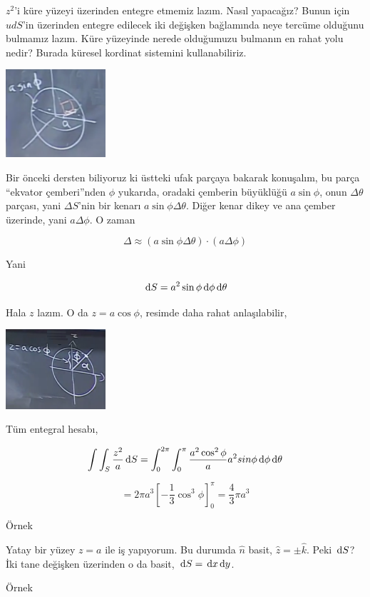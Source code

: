 \documentclass[12pt,fleqn]{article}\usepackage{../../common}
\begin{document}
$z^2$'i küre yüzeyi üzerinden entegre etmemiz lazım. Nasıl yapacağız?  Bunun
için $ud S$'in üzerinden entegre edilecek iki değişken bağlamında neye tercüme
olduğunu bulmamız lazım. Küre yüzeyinde nerede olduğumuzu bulmanın en rahat yolu
nedir? Burada küresel kordinat sistemini kullanabiliriz.

\includegraphics[width=10em]{calc_multi_27_05.png}

Bir önceki dersten biliyoruz ki üstteki ufak parçaya bakarak konuşalım, bu parça
``ekvator çemberi''nden $\phi$ yukarıda, oradaki çemberin büyüklüğü
$a\sin\phi$, onun $\Delta \theta$ parçası, yani $\Delta S$'nin bir kenarı
$a\sin\phi \Delta \theta$. Diğer kenar dikey ve ana çember üzerinde, yani
$a \Delta \phi$. O zaman

$$
\Delta  \approx (a\sin\phi \Delta \theta) \cdot (a \Delta \phi)
$$

Yani

$$
\,\mathrm{d} S = a^2 \sin\phi \,\mathrm{d} \phi \,\mathrm{d} \theta
$$

Hala $z$ lazım. O da $z = a \cos\phi$, resimde daha rahat anlaşılabilir,

\includegraphics[width=10em]{calc_multi_27_06.png}

Tüm entegral hesabı,

$$
\int \int_S \frac{z^2}{a} \,\mathrm{d} S =
\int_{0}^{2\pi} \int_{0}^{\pi} \frac{a^2 \cos^2 \phi}{a} a^2 sin\phi
\,\mathrm{d} \phi \,\mathrm{d} \theta
$$

$$
= 2\pi a^3 \left[ -\frac{1}{3} \cos^3 \phi  \right]_{0}^{\pi} =
\frac{4}{3} \pi a^3
$$

Örnek

Yatay bir yüzey $z = a$ ile iş yapıyorum. Bu durumda $\hat{n}$ basit,
$\hat{z} = \pm \hat{k}$. Peki $\,\mathrm{d} S$? İki tane değişken üzerinden
o da basit, $\,\mathrm{d} S = \,\mathrm{d} x \,\mathrm{d} y$.

Örnek
\end{document}
